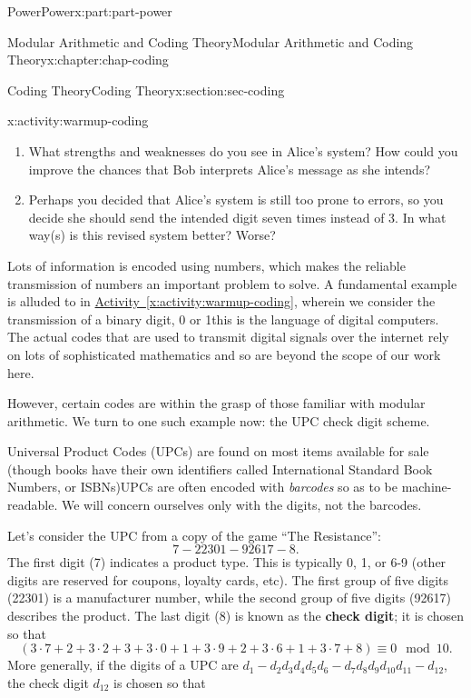 \documentclass[oneside,10pt,]{book}
\newcommand{\xreffont}{\relax}
\newcommand{\terminology}[1]{\textbf{#1}}
\numberwithin{equation}{section}
\begin{document}
\begin{partptx}{Power}{}{Power}{}{}{x:part:part-power}
\begin{chapterptx}{Modular Arithmetic and Coding Theory}{}{Modular Arithmetic and Coding Theory}{}{}{x:chapter:chap-coding}
\begin{sectionptx}{Coding Theory}{}{Coding Theory}{}{}{x:section:sec-coding}
\begin{activity}{}{x:activity:warmup-coding}
\begin{enumerate}
\item{}What strengths and weaknesses do you see in Alice's system? How could you improve the chances that Bob interprets Alice's message as she intends?%
\item{}Perhaps you decided that Alice's system is still too prone to errors, so you decide she should send the intended digit seven times instead of 3. In what way(s) is this revised system better? Worse?%
\end{enumerate}
\end{activity}%
Lots of information is encoded using numbers, which makes the reliable transmission of numbers an important problem to solve. A fundamental example is alluded to in \hyperref[x:activity:warmup-coding]{Activity~{\xreffont\ref{x:activity:warmup-coding}}}, wherein we consider the transmission of a binary digit, 0 or 1\textemdash{}this is the language of digital computers. The actual codes that are used to transmit digital signals over the internet rely on lots of sophisticated mathematics and so are beyond the scope of our work here.%
\par
However, certain codes are within the grasp of those familiar with modular arithmetic. We turn to one such example now: the UPC check digit scheme.%
\par
Universal Product Codes (UPCs) are found on most items available for sale (though books have their own identifiers called International Standard Book Numbers, or ISBNs)UPCs are often encoded with \emph{barcodes} so as to be machine-readable. We will concern ourselves only with the digits, not the barcodes.%
\par
Let's consider the UPC from a copy of the game ``The Resistance'':%
%
\begin{equation*}
7-22301-92617-8.
\end{equation*}
The first digit (7) indicates a product type. This is typically 0, 1, or 6-9 (other digits are reserved for coupons, loyalty cards, etc). The first group of five digits (22301) is a manufacturer number, while the second group of five digits (92617) describes the product. The last digit (8) is known as the \terminology{check digit}; it is chosen so that%
%
\begin{equation*}
(3\cdot 7 + 2 + 3\cdot 2 + 3 + 3\cdot 0 + 1 + 3\cdot 9 + 2 + 3\cdot 6 + 1 + 3\cdot 7 + 8)\equiv 0\mod 10.
\end{equation*}
More generally, if the digits of a UPC are \(d_1 - d_2 d_3 d_4 d_5 d_6 - d_7 d_8 d_9 d_{10} d_{11} - d_{12}\), the check digit \(d_{12}\) is chosen so that%

\end{sectionptx}
\end{chapterptx}
\end{partptx}
\end{document}

